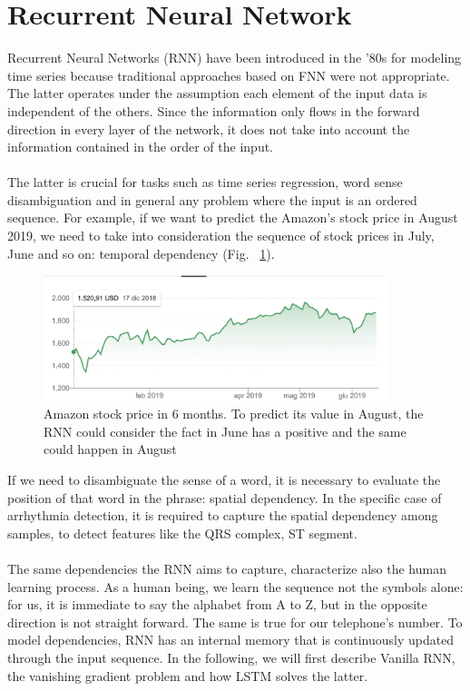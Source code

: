 \documentclass[LaM,binding=0.6cm]{sapthesis}
\begin{document}
\section{Recurrent Neural Network}
Recurrent Neural Networks (RNN) have been introduced in the '80s for modeling time series because traditional approaches based on FNN were not appropriate. The latter operates under the assumption each element of the input data is independent of the others. Since the information only flows in the forward direction in every layer of the network, it does not take into account the information contained in the order of the input.\\\\The latter is crucial for tasks such as time series regression, word sense disambiguation and in general any problem where the input is an ordered sequence. For example, if we want to predict the Amazon's stock price in August 2019, we need to take into consideration the sequence of stock prices in July, June and so on: temporal dependency (Fig. ~\ref{fig:amzsp}).
\begin{figure}   \centering
    \includegraphics[width=100mm,scale=0.7]{amzsp}
    \caption{Amazon stock price in 6 months. To predict its value in August, the RNN could consider the fact in June has a positive and the same could happen in August}
    \label{fig:amzsp}
\end{figure}
If we need to disambiguate the sense of a word, it is necessary to evaluate the position of that word in the phrase: spatial dependency. In the specific case of arrhythmia detection, it is required to capture the spatial dependency among samples, to detect features like the QRS complex, ST segment.\\\\The same dependencies the RNN aims to capture, characterize also the human learning process. As a human being, we learn the sequence not the symbols alone: for us, it is immediate to say the alphabet from A to Z, but in the opposite direction is not straight forward. The same is true for our telephone's number. To model dependencies, RNN has an internal memory that is continuously updated through the input sequence. In the following, we will first describe Vanilla RNN, the vanishing gradient problem and how LSTM solves the latter.
\end{document}
